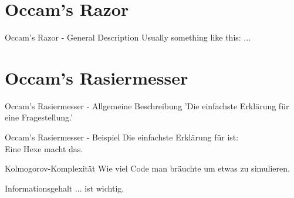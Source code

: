 \ifEnglish

\section{Occam's Razor}

\begin{frame}[c]{Occam's Razor - General Description}
    Usually something like this: ...
\end{frame}



\else


\section{Occam's Rasiermesser}

\begin{frame}[c]{Occam's Rasiermesser - Allgemeine Beschreibung}
    \Large
    'Die einfachste Erklärung für eine Fragestellung.'
\end{frame}


\begin{frame}[c]{Occam's Rasiermesser - Beispiel}
    \Large
    Die einfachste Erklärung für \underline{\hspace{2cm}} ist: \\
    \pause
    Eine Hexe macht das.
\end{frame}


\begin{frame}[c]{Kolmogorov-Komplexität}
    \Large
    \pause
    Wie viel Code man bräuchte um etwas zu simulieren.
\end{frame}


\begin{frame}[standout]
    Informationsgehalt ... \pause ist wichtig.
\end{frame}

\fi
